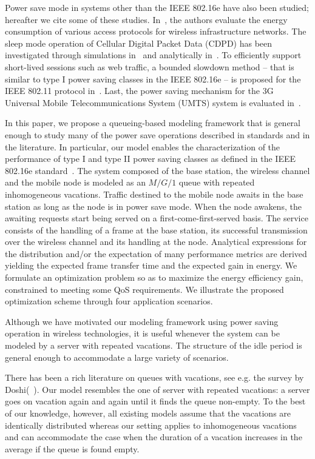 \documentclass[journal]{IEEEtran}
\begin{document}
Power save mode in systems other than the IEEE 802.16e have also been studied; hereafter we cite some of these studies. In~\cite{chen99}, the authors evaluate the energy consumption of various access protocols for wireless infrastructure networks. The sleep mode operation of Cellular Digital Packet Data (CDPD) has been investigated through simulations in~\cite{cdpd99} and analytically in~\cite{cdpd03}. To efficiently support short-lived sessions such as web traffic, a bounded slowdown method -- that is similar to type I
power saving classes in the IEEE 802.16e -- is proposed for the IEEE 802.11 protocol in~\cite{hari02}. Last, the power saving mechanism for the 3G Universal Mobile Telecommunications System (UMTS) system is evaluated in~\cite{yang05}. 

In this paper, we propose a queueing-based modeling framework that is general enough to study many of the power save operations described in standards and in the literature. In particular, our model enables the characterization of the performance of type I and type II power saving classes as defined in the IEEE 802.16e standard~\cite{man}. The system composed of the base station, the wireless channel and the
mobile node is modeled as an $M/G/1$ queue with repeated inhomogeneous vacations. Traffic destined to the mobile node awaits in the base station as long as the node is in power save mode. When the node
awakens, the awaiting requests start being served on a first-come-first-served basis. The service consists of the handling of a frame at the base station, its successful transmission over the wireless channel and its handling at the node. Analytical expressions for the distribution and/or the expectation of many performance metrics are derived yielding the expected frame transfer time and the expected gain in energy. We formulate an optimization problem so as to maximize the energy efficiency gain, constrained to meeting some QoS requirements. We illustrate the proposed optimization scheme through four application scenarios.


Although we have motivated our modeling framework using power saving operation in wireless technologies, it is useful whenever the system can be modeled by a server with repeated vacations. The structure of the idle period is general enough to accommodate a large variety of scenarios. 

There has been a rich literature on queues with vacations, see e.g. the survey by Doshi(~\cite{Doshi}). Our model resembles the one of server with repeated vacations: a server goes on vacation again and again until it finds the queue non-empty. To the best of our knowledge, however, all existing models assume that the vacations are identically distributed whereas our setting applies to inhomogeneous vacations and can accommodate the case when the duration of a vacation increases in the average if the queue is found empty.
\end{document}
